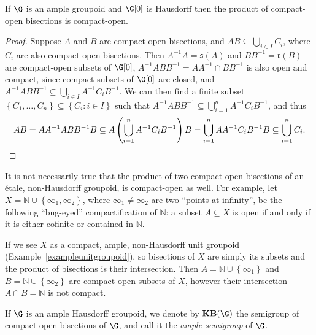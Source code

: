 \begin{proposition}[{\cite[Proposition 2.18(7)]{MR2827424}}]
If $\G$ is an ample groupoid and $\G[0]$ is Hausdorff then the product of compact-open bisections is compact-open.
\end{proposition}
\begin{proof}
Suppose $A$ and $B$ are compact-open bisections, and $AB\subseteq\bigcup_{i\in I}C_i$, where $C_i$ are also compact-open bisections. Then $A^{-1}A=\mathfrak{s}(A)$ and $BB^{-1}=\mathfrak{r}(B)$ are compact-open subsets of $\G[0]$, $A^{-1}ABB^{-1}=AA^{-1}\cap BB^{-1}$ is also open and compact, since compact subsets of $\G[0]$ are closed, and $A^{-1}ABB^{-1}\subseteq\bigcup_{i\in I}A^{-1}C_iB^{-1}$. We can then find a finite subset $\left\{C_1,\ldots,C_n\right\}\subseteq\left\{C_i:i\in I\right\}$ such that $A^{-1}ABB^{-1}\subseteq\bigcup_{i=1}^n A^{-1}C_iB^{-1}$, and thus
\[AB=AA^{-1}ABB^{-1}B\subseteq A\left(\bigcup_{i=1}^nA^{-1}C_iB^{-1}\right)B=\bigcup_{i=1}^nAA^{-1}C_iB^{-1}B\subseteq\bigcup_{i=1}^n C_i.\qedhere\]
\end{proof}

\begin{example}\label{examplebugeyed}
It is not necessarily true that the product of two compact-open bisections of an étale, non-Hausdorff groupoid, is compact-open as well. For example, let $X=\mathbb{N}\cup\left\{\infty_1,\infty_2\right\}$, where $\infty_1\neq\infty_2$ are two ``points at infinity'', be the following ``bug-eyed'' compactification of $\mathbb{N}$: a subset $A\subseteq X$ is open if and only if it is either cofinite or contained in $\mathbb{N}$.

If we see $X$ as a compact, ample, non-Hausdorff unit groupoid (Example~\ref{exampleunitgroupoid}), so bisections of $X$ are simply its subsets and the product of bisections is their intersection. Then $A=\mathbb{N}\cup\left\{\infty_1\right\}$ and $B=\mathbb{N}\cup\left\{\infty_2\right\}$ are compact-open subsets of $X$, however their intersection $A\cap B=\mathbb{N}$ is not compact.
\end{example}

\begin{definition}\label{definitionkbg}
If $\G$ is an ample Hausdorff groupoid, we denote by $\mathbf{KB}(\G)$ the semigroup of compact-open bisections of $\G$, and call it the \emph{ample semigroup} of $\G$.
\end{definition}

